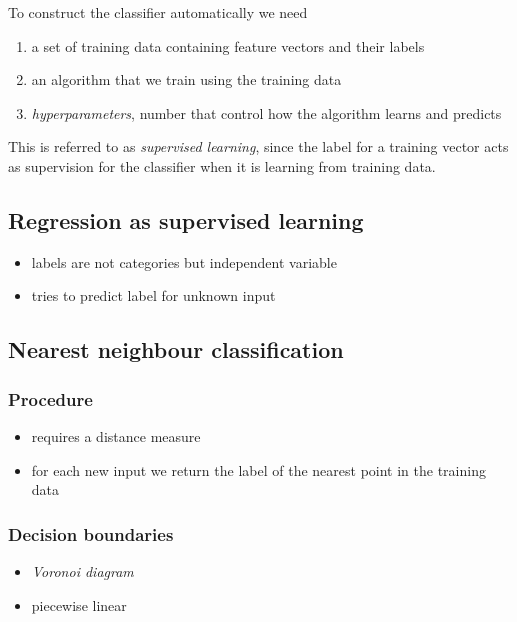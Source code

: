 \documentclass{article}
\begin{document}
To construct the classifier automatically we need
\begin{enumerate}
	\item a set of training data containing feature vectors and their labels
	\item an algorithm that we train using the training data
	\item \emph{hyperparameters}, number that control how the algorithm learns and predicts
\end{enumerate}
This is referred to as \emph{supervised learning}, since the label for a training
vector acts as supervision for the classifier when it is learning from
training data.

\subsection{Regression as supervised learning}

\begin{itemize}
	\item labels are not categories but independent variable
	\item tries to predict label for unknown input
\end{itemize}

\subsection{Nearest neighbour classification}

\subsubsection{Procedure}

\begin{itemize}
	\item requires a distance measure
	\item for each new input we return the label of the nearest point in the training data
\end{itemize}

\subsubsection{Decision boundaries}
\begin{itemize}
	\item \emph{Voronoi diagram}
	\item piecewise linear
\end{itemize}
\end{document}
